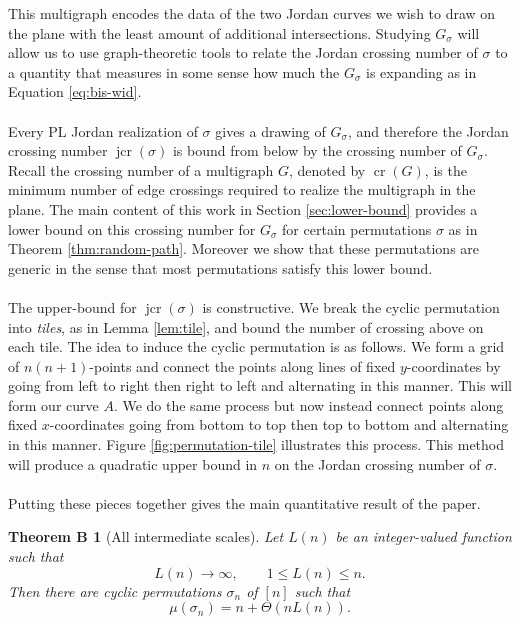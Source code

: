 \documentclass[11pt,a4paper]{amsart}
\newtheorem*{mainintermediate}{Theorem B}
\theoremstyle{definition}
\theoremstyle{remark}
\DeclareMathOperator{\crn}{cr}
\DeclareMathOperator{\jcr}{jcr}
\begin{document}
This multigraph encodes the data of the two Jordan curves we wish to draw on the plane with the least amount of additional intersections.  Studying $G_{\sigma}$ will allow us to use graph-theoretic tools to relate the Jordan crossing number of $\sigma$ to a quantity that measures in some sense how much the $G_{\sigma}$ is expanding as in Equation \ref{eq:bis-wid}.  
\\
\\
Every PL Jordan realization of $\sigma$ gives a drawing of $G_{\sigma}$, and therefore the Jordan crossing number $\jcr(\sigma)$ is bound from below by the crossing number of $G_{\sigma}$.  Recall the crossing number of a multigraph $G$, denoted by $\crn(G)$, is the minimum number of edge crossings required to realize the multigraph in the plane.  The main content of this work in Section \ref{sec:lower-bound} provides a lower bound on this crossing number for $G_{\sigma}$ for certain permutations $\sigma$ as in Theorem \ref{thm:random-path}.  Moreover we show that these permutations are generic in the sense that most permutations satisfy this lower bound.  
\\
\\
The upper-bound for $\jcr(\sigma)$ is constructive.  We break the cyclic permutation into \emph{tiles}, as in Lemma \ref{lem:tile}, and bound the number of crossing above on each tile.  The idea to induce the cyclic permutation is as follows.  We form a grid of $n(n+1)$-points and connect the points along lines of fixed $y$-coordinates by going from left to right then right to left and alternating in this manner.  This will form our curve $A$.  We do the same process but now instead connect points along fixed $x$-coordinates going from bottom to top then top to bottom and alternating in this manner.  Figure \ref{fig:permutation-tile} illustrates this process.  This method will produce a quadratic upper bound in $n$ on the Jordan crossing number of $\sigma$.  
\\
\\
Putting these pieces together gives the main quantitative result of the paper.
\begin{mainintermediate}[All intermediate scales]
Let $L(n)$ be an integer-valued function such that
\begin{equation*}
        L(n)\to\infty,
        \qquad
        1 \le L(n) \le n.
\end{equation*}
Then there are cyclic permutations $\sigma_n$ of $[n]$ such that
\begin{equation*}
        \mu(\sigma_n)=n+\Theta(nL(n)).
\end{equation*}
\end{mainintermediate}
\end{document}
